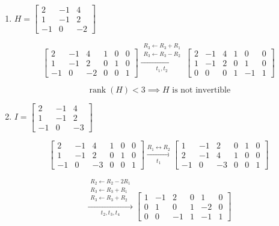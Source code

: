 \begin{enumerate}[label=\alph*)]
\item
$H=
\begin{bmatrix}
    2 & -1 & 4\\
    1 & -1 & 2\\
    -1 & 0 & -2
\end{bmatrix}
$

\begin{answer}
    $$
    \left[
    \begin{array}{ccc|ccc}
         2 & -1 & 4 & 1 & 0 & 0\\
         1 & -1 & 2 & 0 & 1 & 0\\
        -1 & 0 & -2 & 0 & 0 & 1
    \end{array}
    \right]
    \xrightarrow[t_1,t_2]{
        \substack{
            R_3\leftarrow R_3+R_1\\
            R_3\leftarrow R_3-R_2
        }
    }
    \left[
    \begin{array}{ccc|ccc}
        2 & -1 & 4 & 1 & 0 & 0\\
        1 & -1 & 2 & 0 & 1 & 0\\
        0 & 0 & 0 & 1 & -1 & 1
    \end{array}
    \right]
    $$

    $$
    \operatorname{rank}(H)<3
    \implies
    \boxed{H\text{ is not invertible}}
    $$
\end{answer}

\item
$I=
\begin{bmatrix}
    2 & -1 & 4\\
    1 & -1 & 2\\
    -1 & 0 & -3
\end{bmatrix}
$

\begin{answer}
    $$
    \left[
    \begin{array}{ccc|ccc}
         2 & -1 & 4 & 1 & 0 & 0\\
         1 & -1 & 2 & 0 & 1 & 0\\
        -1 & 0 & -3 & 0 & 0 & 1
    \end{array}
    \right]
    \xrightarrow[t_1]{R_1\leftrightarrow R_2}
    \left[
    \begin{array}{ccc|ccc}
         1 & -1 & 2 & 0 & 1 & 0\\
         2 & -1 & 4 & 1 & 0 & 0\\
        -1 & 0 & -3 & 0 & 0 & 1
    \end{array}
    \right]
    $$

    $$
    \xrightarrow[t_2,t_3,t_4]{
        \substack{
            R_2\leftarrow R_2-2R_1\\
            R_3\leftarrow R_3+R_1\\
            R_3\leftarrow R_3+R_2
        }
    }
    \left[
    \begin{array}{ccc|ccc}
        1 & -1 & 2 & 0 & 1 & 0\\
        0 & 1 & 0 & 1 & -2 & 0\\
        0 & 0 & -1 & 1 & -1 & 1
    \end{array}
    \right]
    $$


\end{answer}
\end{enumerate}
